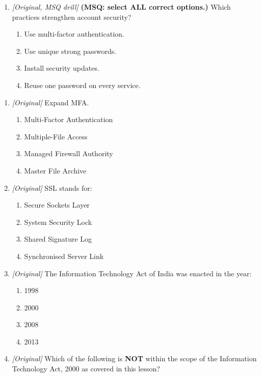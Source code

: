\begin{enumerate}[label=\textbf{Q\arabic*.}, leftmargin=*]
\item \textit{[Original, MSQ drill]} \textbf{(MSQ: select ALL correct options.)} Which practices strengthen account security?
  \begin{enumerate}[label=\Alph*.]
\item Use multi-factor authentication.
   \item Use unique strong passwords.
   \item Install security updates.
   \item Reuse one password on every service.
  \end{enumerate}

\end{enumerate}
\begin{enumerate}[label=\textbf{Q\arabic*.}, leftmargin=*]
\item \textit{[Original]} Expand MFA.
  \begin{enumerate}[label=\Alph*.]
    \item Multi-Factor Authentication
    \item Multiple-File Access
    \item Managed Firewall Authority
    \item Master File Archive
  \end{enumerate}
\item \textit{[Original]} SSL stands for:
  \begin{enumerate}[label=\Alph*.]
    \item Secure Sockets Layer
    \item System Security Lock
    \item Shared Signature Log
    \item Synchronised Server Link
  \end{enumerate}
\item \textit{[Original]} The Information Technology Act of India was
  enacted in the year:
  \begin{enumerate}[label=\Alph*.]
    \item 1998
    \item 2000
    \item 2008
    \item 2013
  \end{enumerate}
\item \textit{[Original]} Which of the following is \textbf{NOT} within the
  scope of the Information Technology Act, 2000 as covered in this lesson?
  \begin{enumerate}[label=\Alph*.]

\end{enumerate}
\end{enumerate}
